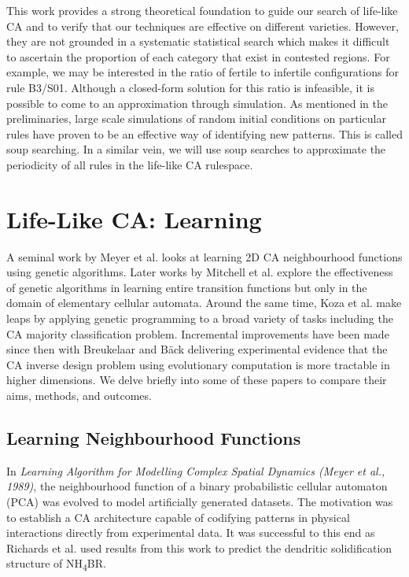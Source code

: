 This work provides a strong theoretical foundation to guide our search of life-like CA and to verify that our techniques are effective on different varieties. However, they are not grounded in a systematic statistical search which makes it difficult to ascertain the proportion of each category that exist in contested regions. For example, we may be interested in the ratio of fertile to infertile configurations for rule B3/S01. Although a closed-form solution for this ratio is infeasible, it is possible to come to an approximation through simulation. As mentioned in the preliminaries, large scale simulations of random initial conditions on particular rules have proven to be an effective way of identifying new patterns\cite{flammenkamp}. This is called soup searching. In a similar vein, we will use soup searches to approximate the periodicity of all rules in the life-like CA rulespace.

\section{Life-Like CA: Learning}

A seminal work by Meyer et al.\cite{meyer1989learning} looks at learning 2D CA neighbourhood functions using genetic algorithms. Later works by Mitchell et al.\cite{mitchell1996evolving} explore the effectiveness of genetic algorithms in learning entire transition functions but only in the domain of elementary cellular automata. Around the same time, Koza et al. make leaps by applying genetic programming to a broad variety of tasks including the CA majority classification problem\cite{andre1996discovery}. Incremental improvements have been made since then with Breukelaar and B{\"a}ck\cite{breukelaar2005using} delivering experimental evidence that the CA inverse design problem using evolutionary computation is more tractable in higher dimensions. We delve briefly into some of these papers to compare their aims, methods, and outcomes.

\subsection{Learning Neighbourhood Functions}

In \textit{Learning Algorithm for Modelling Complex Spatial Dynamics (Meyer et al., 1989)}\cite{meyer1989learning}, the neighbourhood function of a binary probabilistic cellular automaton (PCA) was evolved to model artificially generated datasets. The motivation was to establish a CA architecture capable of codifying patterns in physical interactions directly from experimental data. It was successful to this end as Richards et al.\cite{richards1990extracting} used results from this work to predict the dendritic solidification structure of NH\textsubscript{4}BR.\\

